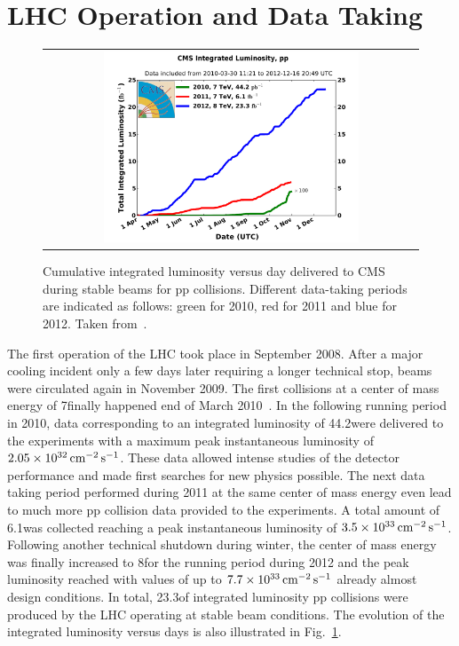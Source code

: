 \section{LHC Operation and Data Taking}
\label{sec:data}
\begin{figure}[!tp]
  \centering
  \begin{tabular}{c}
    \includegraphics[width=0.7\textwidth]{figures/int_lumi_cumulative_pp_2.pdf}
  \end{tabular}
  \caption{Cumulative integrated luminosity versus day delivered to CMS during stable beams for pp collisions. Different data-taking periods are indicated as follows: green for 2010, red for 2011 and blue for 2012. Taken from~\cite{bib:lhc:lumi12}.}
  \label{fig:lhc_data}
\end{figure}
The first operation of the LHC took place in September 2008. After a major cooling incident only a few days later requiring a longer technical stop, beams were circulated again in November 2009. The first collisions at a center of mass energy of 7\tev finally happened end of March 2010~\cite{bib:lhcmachineoutreach}. In the following running period in 2010, data corresponding to an integrated luminosity of 44.2\pbinv were delivered to the experiments with a maximum peak instantaneous luminosity of $2.05 \times 10^{32} \,\text{cm}^{-2} \,\text{s}^{-1}$. These data allowed intense studies of the detector performance and made first searches for new physics possible. The next data taking period performed during 2011 at the same center of mass energy even lead to much more pp collision data provided to the experiments. A total amount of 6.1\fbinv was collected reaching a peak instantaneous luminosity of $3.5 \times 10^{33} \,\text{cm}^{-2} \,\text{s}^{-1}$. Following another technical shutdown during winter, the center of mass energy was finally increased to 8\tev for the running period during 2012 and the peak luminosity reached with values of up to $7.7 \times 10^{33} \,\text{cm}^{-2} \,\text{s}^{-1}$ already almost design conditions. In total, 23.3\fbinv of integrated luminosity pp collisions were produced by the LHC operating at stable beam conditions. The evolution of the integrated luminosity versus days is also illustrated in Fig.~\ref{fig:lhc_data}. \\
